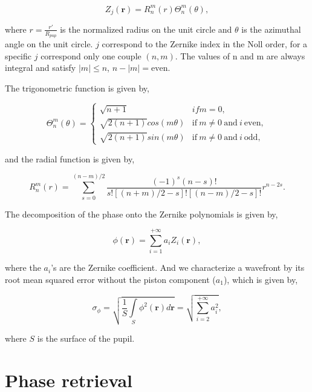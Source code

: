 \begin{equation}
Z_j(\mathbf{r}) = R_n^m(r)\Theta^m_n(\theta),
\label{eqt:ZernikePol}
\end{equation}

where $r=\frac{r'}{R_{pup}}$ is the normalized radius on the unit circle and $\theta$ is the azimuthal angle on the unit circle. $j$ correspond to the Zernike index in the Noll order, for a specific $j$ correspond only one couple $(n,m)$. The values of n and m are always integral and satisfy $|m| \leq n$, $n - |m| = \mathrm{even}$.

The trigonometric function is given by,

\begin{equation}
\Theta_n^m(\theta) = 
\begin{cases} 
\sqrt{n+1} &if m=0, \\
\sqrt{2(n+1)}cos(m\theta) &\mathrm{if} \ m \neq 0 \ \mathrm{and} \ i \ \mathrm{even}, \\
\sqrt{2(n+1)}sin(m\theta) &\mathrm{if} \ m \neq 0 \ \mathrm{and} \ i \ \mathrm{odd},
\end{cases}
\label{eqt:trigoFunc}
\end{equation}

and the radial function is given by,

\begin{equation}
R_n^m(r) = \sum\limits_{s=0}^{(n-m)/2}\frac{(-1)^s(n-s)!}{s![(n+m)/2-s]![(n-m)/2-s]!}r^{n-2s}.
\label{eqt:radialFunction}
\end{equation}

The decomposition of the phase onto the Zernike polynomials is given by,

\begin{equation}
\phi (\mathbf{r}) = \sum\limits_{i=1}^{+\infty}a_iZ_i(\mathbf{r}),
\label{eqt:decompPhase}
\end{equation}

where the $a_i$'s are the Zernike coefficient. And we characterize a wavefront by its root mean squared error without the piston component ($a_1$), which is given by,

\begin{equation}
\sigma_{\phi} = \sqrt{\frac{1}{S}\int\limits_S \phi^2(\mathbf{r})d\mathbf{r}} = \sqrt{\sum\limits_{i=2}^{+\infty}a_i^2},
\label{eqt:WFrmsError}
\end{equation}

where $S$ is the surface of the pupil.

\section{Phase retrieval}


